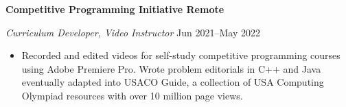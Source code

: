 \textbf{Competitive Programming Initiative \hfill Remote}\par
\textit{Curriculum Developer, Video Instructor} \hfill Jun 2021--May 2022

\begin{itemize}
	\item Recorded and edited videos for self-study competitive programming courses using Adobe Premiere Pro. Wrote problem editorials in C++ and Java eventually adapted into USACO Guide, a collection of USA Computing Olympiad resources with over 10 million page views.
\end{itemize}\par